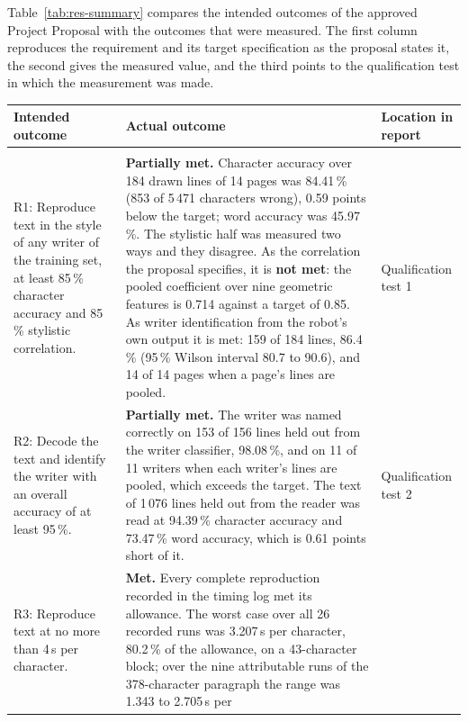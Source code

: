 Table~\ref{tab:res-summary} compares the intended outcomes of the approved
Project Proposal with the outcomes that were measured. The first column
reproduces the requirement and its target specification as the proposal states
it, the second gives the measured value, and the third points to the
qualification test in which the measurement was made.

\begin{table}[h]
\centering
\fontsize{10}{12}\selectfont
\begin{tabularx}{\linewidth}{|>{\raggedright\arraybackslash}p{4.3cm}|>{\raggedright\arraybackslash}X|>{\raggedright\arraybackslash}p{2.2cm}|}
\hline
\textbf{Intended outcome} & \textbf{Actual outcome} & \textbf{Location in report} \\
\hline
\multicolumn{3}{|l|}{\textbf{Core mission requirements and specifications}} \\
\hline
R1: Reproduce text in the style of any writer of the training set, at least
85\,\% character accuracy and 85\,\% stylistic correlation. &
\textbf{Partially met.} Character accuracy over 184 drawn lines of 14 pages was
84.41\,\% (853 of 5\,471 characters wrong), 0.59 points below the target; word
accuracy was 45.97\,\%. The stylistic half was measured two ways and they
disagree. As the correlation the proposal specifies, it is \textbf{not met}:
the pooled coefficient over nine geometric features is 0.714 against a target
of 0.85. As writer identification from the robot's own output it is met: 159 of
184 lines, 86.4\,\% (95\,\% Wilson interval 80.7 to 90.6), and 14 of 14 pages
when a page's lines are pooled. &
Qualification test 1 \\
\hline
R2: Decode the text and identify the writer with an overall accuracy of at
least 95\,\%. &
\textbf{Partially met.} The writer was named correctly on 153 of 156 lines held
out from the writer classifier, 98.08\,\%, and on 11 of 11 writers when each
writer's lines are pooled, which exceeds the target. The text of 1\,076 lines
held out from the reader was read at 94.39\,\% character accuracy and 73.47\,\%
word accuracy, which is 0.61 points short of it. &
Qualification test 2 \\
\hline
R3: Reproduce text at no more than 4\,s per character. &
\textbf{Met.} Every complete reproduction recorded in the timing log met its
allowance. The worst case over all 26 recorded runs was 3.207\,s per character,
80.2\,\% of the allowance, on a 43-character block; over the nine attributable
runs of the 378-character paragraph the range was 1.343 to 2.705\,s per

\end{tabularx}
\end{table}
